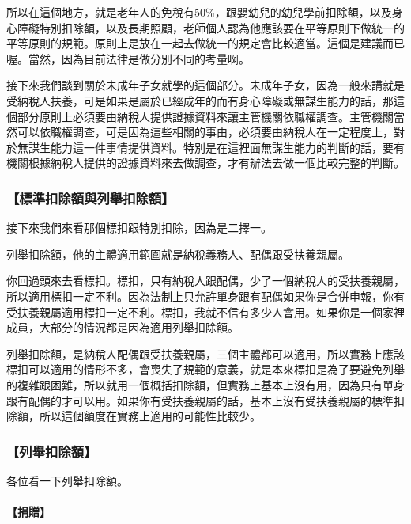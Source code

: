 \documentclass[oneside,sub3section]{ctexbook}
\let\oldparagraph\paragraph
\renewcommand{\paragraph}[1]{\oldparagraph{#1}\mbox{}}
\begin{document}
所以在這個地方，就是老年人的免稅有50\%，跟嬰幼兒的幼兒學前扣除額，以及身心障礙特別扣除額，以及長期照顧，老師個人認為他應該要在平等原則下做統一的平等原則的規範。原則上是放在一起去做統一的規定會比較適當。這個是建議而已喔。當然，因為目前法律是做分別不同的考量啊。

接下來我們談到關於未成年子女就學的這個部分。未成年子女，因為一般來講就是受納稅人扶養，可是如果是屬於已經成年的而有身心障礙或無謀生能力的話，那這個部分原則上必須要由納稅人提供證據資料來讓主管機關依職權調查。主管機關當然可以依職權調查，可是因為這些相關的事由，必須要由納稅人在一定程度上，對於無謀生能力這一件事情提供資料。特別是在這裡面無謀生能力的判斷的話，要有機關根據納稅人提供的證據資料來去做調查，才有辦法去做一個比較完整的判斷。

\hypertarget{ux6a19ux6e96ux6263ux9664ux984dux8207ux5217ux8209ux6263ux9664ux984d}{%
\subsubsection{【標準扣除額與列舉扣除額】}\label{ux6a19ux6e96ux6263ux9664ux984dux8207ux5217ux8209ux6263ux9664ux984d}}

接下來我們來看那個標扣跟特別扣除，因為是二擇一。

列舉扣除額，他的主體適用範圍就是納稅義務人、配偶跟受扶養親屬。

你回過頭來去看標扣。標扣，只有納稅人跟配偶，少了一個納稅人的受扶養親屬，所以適用標扣一定不利。因為法制上只允許單身跟有配偶如果你是合併申報，你有受扶養親屬適用標扣一定不利。標扣，我就不信有多少人會用。如果你是一個家裡成員，大部分的情況都是因為適用列舉扣除額。

列舉扣除額，是納稅人配偶跟受扶養親屬，三個主體都可以適用，所以實務上應該標扣可以適用的情形不多，會喪失了規範的意義，就是本來標扣是為了要避免列舉的複雜跟困難，所以就用一個概括扣除額，但實務上基本上沒有用，因為只有單身跟有配偶的才可以用。如果你有受扶養親屬的話，基本上沒有受扶養親屬的標準扣除額，所以這個額度在實務上適用的可能性比較少。

\hypertarget{ux5217ux8209ux6263ux9664ux984d}{%
\subsubsection{【列舉扣除額】}\label{ux5217ux8209ux6263ux9664ux984d}}

各位看一下列舉扣除額。

\hypertarget{ux6350ux8d08}{%
\paragraph{【捐贈】}\label{ux6350ux8d08}}
\end{document}

